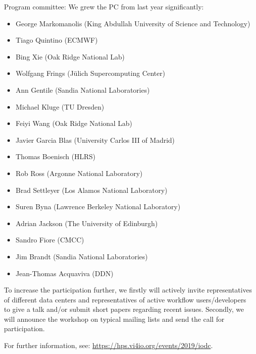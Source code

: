\documentclass[a4paper,10pt]{article}
\begin{document}
Program committee:
We grew the PC from last year significantly:
\begin{itemize}
  \item George Markomanolis (King Abdullah University of Science and Technology)
  \item Tiago Quintino (ECMWF)
  \item Bing Xie (Oak Ridge National Lab)
  \item Wolfgang Frings (Jülich Supercomputing Center)
  \item Ann Gentile (Sandia National Laboratories)
  \item Michael Kluge (TU Dresden)
  \item Feiyi Wang (Oak Ridge National Lab)
  \item Javier Garcia Blas (University Carlos III of Madrid)
  \item Thomas Boenisch (HLRS)
  \item Rob Ross (Argonne National Laboratory)
  \item Brad Settleyer (Los Alamos National Laboratory)
  \item Suren Byna (Lawrence Berkeley National Laboratory)
  \item Adrian Jackson (The University of Edinburgh)
  \item Sandro Fiore (CMCC)
  \item Jim Brandt (Sandia National Laboratories)
  \item Jean-Thomas Acquaviva (DDN)
\end{itemize}

To increase the participation further, we firstly will actively invite representatives of different data centers and representatives of active workflow users/developers to give a talk and/or submit short papers regarding recent issues.
Secondly, we will announce the workshop on typical mailing lists and send the call for participation.


For further information, see:
\url{https://hps.vi4io.org/events/2019/iodc}.

\end{document}
